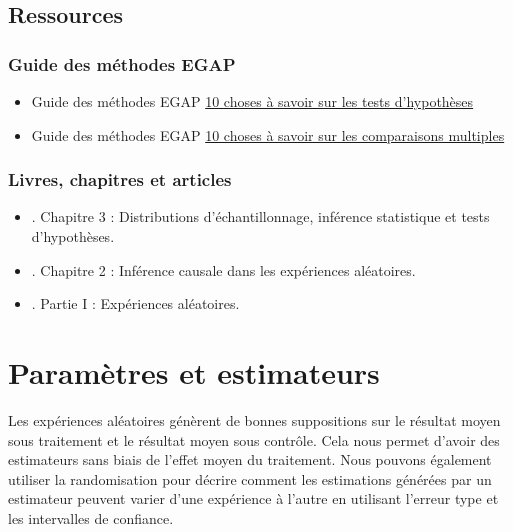 \documentclass[12pt,]{book}
\begin{document}
\hypertarget{ressources-3}{%
\section{Ressources}\label{ressources-3}}

\hypertarget{guide-des-muxe9thodes-egap-3}{%
\subsection{Guide des méthodes EGAP}\label{guide-des-muxe9thodes-egap-3}}

\begin{itemize}
\item
  Guide des méthodes EGAP \href{https://egap.org/resource/10-things-to-know-about-hypothesis-testing/}{10 choses à savoir sur les tests d'hypothèses}
\item
  Guide des méthodes EGAP \href{https://egap.org/resource/10-things-to-know-about-multiple-comparisons/}{10 choses à savoir sur les comparaisons multiples}
\end{itemize}

\hypertarget{livres-chapitres-et-articles-2}{%
\subsection{Livres, chapitres et articles}\label{livres-chapitres-et-articles-2}}

\begin{itemize}
\item
  \autocite{gerber_field_2012}. Chapitre 3 : Distributions d'échantillonnage, inférence statistique et tests d'hypothèses.
\item
  \autocite{rosenbaum2010design}. Chapitre 2 : Inférence causale dans les expériences aléatoires.
\item
  \autocite{rosenbaum2017observation}. Partie I : Expériences aléatoires.
\end{itemize}

\hypertarget{paramuxe8tres-et-estimateurs}{%
\chapter{Paramètres et estimateurs}\label{paramuxe8tres-et-estimateurs}}

Les expériences aléatoires génèrent de bonnes suppositions sur le résultat moyen sous traitement et le résultat moyen sous contrôle. Cela nous permet d'avoir des estimateurs sans biais de l'effet moyen du traitement. Nous pouvons également utiliser la randomisation pour décrire comment les estimations générées par un estimateur peuvent varier d'une expérience à l'autre en utilisant l'erreur type et les intervalles de confiance.
\end{document}
